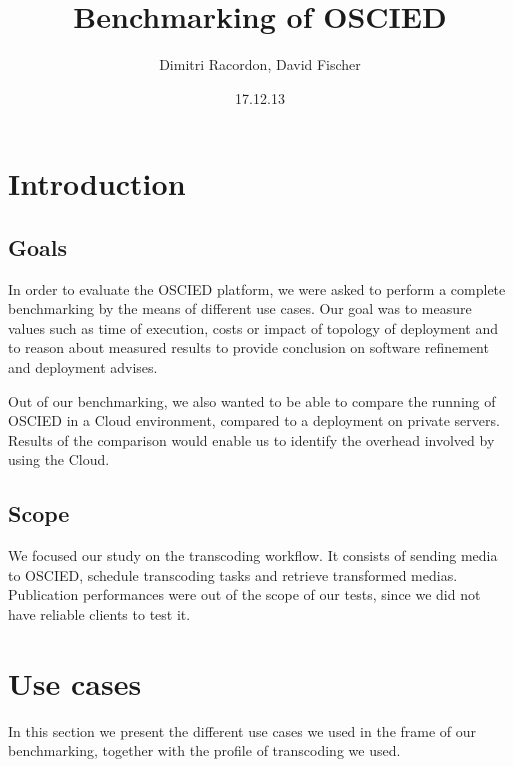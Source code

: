 \documentclass[a4paper, titlepage]{paper}
\numberwithin{figure}{section}
\numberwithin{table}{section}
\begin{document}
  \title{Benchmarking of OSCIED}
  \author{Dimitri Racordon, David Fischer}
  \date{17.12.13}
  \maketitle

  \clearpage

  \section{Introduction}
    \subsection{Goals}
      In order to evaluate the OSCIED platform, we were asked to perform a complete benchmarking by the means of different use cases. Our goal was to measure values such as time of execution, costs or impact of topology of deployment and to reason about measured results to provide conclusion on software refinement and deployment advises.

      Out of our benchmarking, we also wanted to be able to compare the running of OSCIED in a Cloud environment, compared to a deployment on private servers. Results of the comparison would enable us to identify the overhead involved by using the Cloud.

    \subsection{Scope}
      We focused our study on the transcoding workflow. It consists of sending media to OSCIED, schedule transcoding tasks and retrieve transformed medias. Publication performances were out of the scope of our tests, since we did not have reliable clients to test it.

  \section{Use cases}
    In this section we present the different use cases we used in the frame of our benchmarking, together with the profile of transcoding we used.
\end{document}
